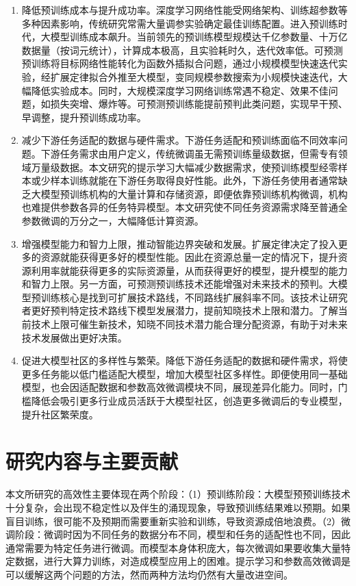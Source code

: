 \begin{enumerate}
  \item 降低预训练成本与提升成功率。深度学习网络性能受网络架构、训练超参数等多种因素影响，传统研究常需大量调参实验确定最佳训练配置。进入预训练时代，大模型训练成本飙升。当前领先的预训练模型规模达千亿参数量、十万亿数据量（按词元统计），计算成本极高，且实验耗时久，迭代效率低。可预测预训练将目标网络性能转化为函数外插拟合问题，通过小规模模型快速迭代实验，经扩展定律拟合外推至大模型，变同规模参数搜索为小规模快速迭代，大幅降低实验成本。同时，大规模深度学习网络训练常遇不稳定、效果不佳问题，如损失突增、爆炸等。可预测预训练能提前预判此类问题，实现早干预、早调整，提升预训练成功率。
  \item 减少下游任务适配的数据与硬件需求。下游任务适配和预训练面临不同效率问题。下游任务需求由用户定义，传统微调虽无需预训练量级数据，但需专有领域万量级数据。本文研究的提示学习大幅减少数据需求，使预训练模型经零样本或少样本训练就能在下游任务取得良好性能。此外，下游任务使用者通常缺乏大模型预训练机构的大量计算和存储资源，即便依靠预训练机构微调，机构也难提供参数各异的任务特异模型。本文研究使不同任务资源需求降至普通全参数微调的万分之一，大幅降低计算资源。
  \item 增强模型能力和智力上限，推动智能边界突破和发展。扩展定律决定了投入更多的资源就能获得更多好的模型性能。因此在资源总量一定的情况下，提升资源利用率就能获得更多的实际资源量，从而获得更好的模型，提升模型的能力和智力上限。另一方面，可预测预训练技术还能增强对未来技术的预判。大模型预训练核心是找到可扩展技术路线，不同路线扩展斜率不同。该技术让研究者更好预判特定技术路线下模型发展潜力，提前知晓技术上限和潜力。了解当前技术上限可催生新技术，知晓不同技术潜力能合理分配资源，有助于对未来技术发展做出更好决策。
  \item 促进大模型社区的多样性与繁荣。降低下游任务适配的数据和硬件需求，将使更多任务能以低门槛适配大模型，增加大模型社区多样性。即便使用同一基础模型，也会因适配数据和参数高效微调模块不同，展现差异化能力。同时，门槛降低会吸引更多行业成员活跃于大模型社区，创造更多微调后的专业模型，提升社区繁荣度。
\end{enumerate}


\section{研究内容与主要贡献}
本文所研究的高效性主要体现在两个阶段：（1）预训练阶段：大模型预预训练技术十分复杂，会出现不稳定性以及伴生的涌现现象，导致预训练结果难以预期。如果盲目训练，很可能不及预期而需要重新实验和训练，导致资源成倍地浪费。（2）微调阶段：微调时因为不同任务的数据分布不同，模型和任务的适配性也不同，因此通常需要为特定任务进行微调。而模型本身体积庞大，每次微调如果要收集大量特定数据，进行大算力训练，对造成模型应用上的困难。提示学习和参数高效微调是可以缓解这两个问题的方法，然而两种方法均仍然有大量改进空间。

